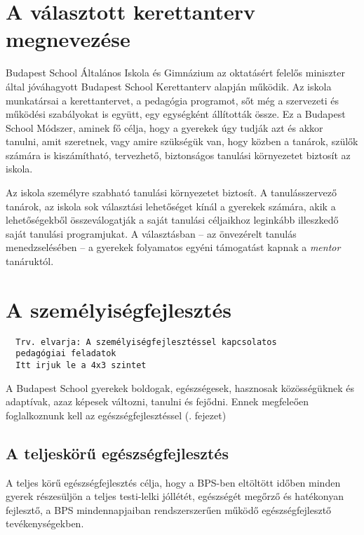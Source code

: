 \section{A választott kerettanterv
  megnevezése}

Budapest School Általános Iskola és Gimnázium az oktatásért felelős
miniszter által jóváhagyott Budapest School Kerettanterv alapján
működik. Az iskola munkatársai a kerettantervet, a pedagógia programot,
sőt még a szervezeti és működési szabályokat is együtt, egy egységként
állították össze. Ez a Budapest School Módszer, aminek fő célja, hogy a
gyerekek úgy tudják azt és akkor tanulni, amit szeretnek, vagy amire
szükségük van, hogy közben a tanárok, szülők számára is kiszámítható,
tervezhető, biztonságos tanulási környezetet biztosít az iskola.

Az iskola személyre szabható tanulási környezetet biztosít. A
tanulásszervező tanárok, az iskola sok választási lehetőséget kínál a
gyerekek számára, akik a lehetőségekből összeválogatják a saját tanulási
céljaikhoz leginkább illeszkedő saját tanulási programjukat. A
választásban -- az önvezérelt tanulás menedzselésében -- a gyerekek
folyamatos egyéni támogatást kapnak a \emph{mentor} tanáruktól.

\section{A személyiségfejlesztés}
\label{sec:szemilyesegfejlesztes}
\begin{verbatim}
  Trv. elvarja: A személyiségfejlesztéssel kapcsolatos
  pedagógiai feladatok
  Itt irjuk le a 4x3 szintet
\end{verbatim}

A Budapest School gyerekek boldogak, egészségesek, hasznosak közösségüknek és
adaptívak, azaz képesek változni, tanulni és fejődni. Ennek megfeleően
foglalkoznunk kell az egészségfejlesztéssel (.
fejezet)

\subsection{A teljeskörű
      egészségfejlesztés}\label{sec:egeszsegfejlesztes}

A teljes körű egészségfejlesztés célja, hogy a BPS-ben eltöltött időben
minden gyerek részesüljön a teljes testi-lelki jóllétét, egészségét
megőrző és hatékonyan fejlesztő, a BPS mindennapjaiban rendszerszerűen
működő egészségfejlesztő tevékenységekben.

